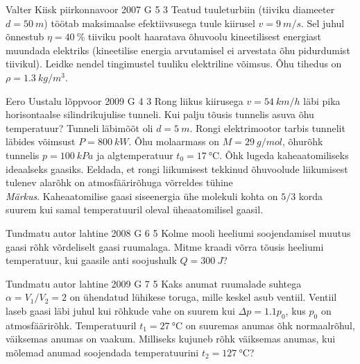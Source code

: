 \documentclass[11pt]{article}
\begin{document}
{%
{Valter Kiisk} %
{piirkonnavoor} %
{2007} %
{G 5} %
{3} %
{
\ifStatement
Teatud tuuleturbiin (tiiviku diameeter $d = \SI{50}{m}$) töötab maksimaalse efektiivsusega tuule kiirusel $v = \SI{9}{m/s}$. Sel juhul õnnestub $\eta = \SI{40}{\%}$ tiiviku poolt haaratava õhuvoolu kineetilisest energiast muundada elektriks (kineetilise energia arvutamisel ei arvestata õhu pidurdumist tiivikul). Leidke nendel tingimustel tuuliku elektriline võimsus. Õhu tihedus on $\rho = \SI{1,3}{kg/m^3}$.
\fi
}

{Eero Uustalu} %
{lõppvoor} %
{2009} %
{G 4} %
{3} %
{
\ifStatement
Rong liikus kiirusega $v=\SI{54}{km/h}$ läbi pika horisontaalse silindrikujulise tunneli.
Kui palju tõusis tunnelis asuva õhu temperatuur? Tunneli läbimõõt oli $d=\SI{5}{m}$.
Rongi elektrimootor tarbis tunnelit läbides võimsust $P=\SI{800}{kW}$.
Õhu molaarmass on $M=\SI{29}{g/mol}$, õhurõhk tunnelis $p=\SI{100}{kPa}$ ja algtemperatuur $t_0=\SI{17}{\celsius}$.
Õhk lugeda kaheaatomiliseks ideaalseks gaasiks. Eeldada, et rongi liikumisest tekkinud õhuvoolude liikumisest tulenev alarõhk on atmosfäärirõhuga võrreldes tühine\\
\emph{Märkus}. Kaheaatomilise gaasi siseenergia ühe molekuli kohta on $5/3$ korda suurem kui samal temperatuuril oleval üheaatomilisel gaasil.
\fi
}

{Tundmatu autor} %
{lahtine} %
{2008} %
{G 6} %
{5} %
{
\ifStatement
Kolme mooli heeliumi soojendamisel muutus gaasi rõhk võrdeliselt gaasi ruumalaga. Mitme kraadi võrra tõusis heeliumi temperatuur, kui gaasile anti soojushulk $Q = \SI{300}{J}$?
\fi
}

{Tundmatu autor} %
{lahtine} %
{2009} %
{G 7} %
{5} %
{
\ifStatement
Kaks anumat ruumalade suhtega $\alpha = V_1/V_2 = 2$ on ühendatud lühikese toruga, mille keskel asub ventiil. Ventiil laseb gaasi läbi juhul kui rõhkude vahe on suurem kui $\Delta p = \num{1,1}p_0$, kus $p_0$ on atmosfäärirõhk. Temperatuuril $t_1 = \SI{27}{\celsius}$ on suuremas anumas õhk normaalrõhul, väiksemas anumas on vaakum. Milliseks kujuneb rõhk väiksemas anumas, kui mõlemad anumad soojendada temperatuurini $t_2 = \SI{127}{\celsius}$?
\fi
}

}
\end{document}
